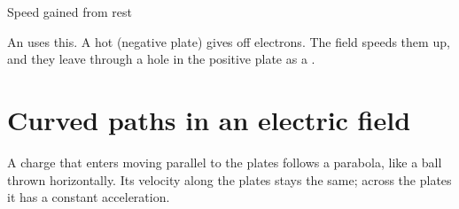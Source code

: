 \begin{formulacard}[combine={$W = qV$ and $K = \frac{1}{2}mv^2$}]{Speed gained from rest}
  \begin{symbols}
  \end{symbols}
\end{formulacard}

An  uses this. A hot  (negative plate) gives off
electrons. The field speeds them up, and they leave through a hole in the
positive plate as a .

\section{Curved paths in an electric field}\label{ch1:sec:paths}

\begin{bigidea}
A charge that enters moving parallel to the plates follows a parabola, like a
ball thrown horizontally. Its velocity along the plates stays the same; across
the plates it has a constant acceleration.
\end{bigidea}

